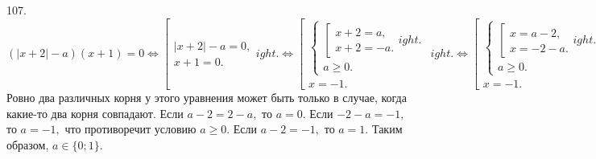 107. $(|x+2|-a)(x+1)=0\Leftrightarrow \left[\begin{array}{l}|x+2|-a=0,\\ x+1=0.\end{array}
ight.\Leftrightarrow
\left[\begin{array}{l}
\begin{cases}
\left[\begin{array}{l}
x+2=a,\\
x+2=-a.
\end{array}
ight.\\
a\geqslant0.
\end{cases}\\
x=-1.
\end{array}
ight.\Leftrightarrow
\left[\begin{array}{l}
\begin{cases}
\left[\begin{array}{l}
x=a-2,\\
x=-2-a.
\end{array}
ight.\\
a\geqslant0.
\end{cases}\\
x=-1.
\end{array}
ight.$
Ровно два различных корня у этого уравнения может быть только в случае, когда какие-то два корня совпадают. Если $a-2=2-a,$ то $a=0.$ Если $-2-a=-1,$ то $a=-1,$ что противоречит условию $a\geqslant0.$ Если $a-2=-1,$ то $a=1.$ Таким образом, $a\in\{0;1\}.$\\
